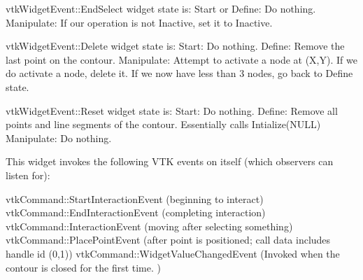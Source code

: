 \begin{DoxyPre}   vtkWidgetEvent::EndSelect
        widget state is: 
            Start or
            Define: Do nothing.
            Manipulate: If our operation is not Inactive, set it to
                  Inactive.\end{DoxyPre}



\begin{DoxyPre}   vtkWidgetEvent::Delete
        widget state is: 
            Start: Do nothing.
            Define: Remove the last point on the contour.
            Manipulate: Attempt to activate a node at (X,Y). If
                   we do activate a node, delete it. If we now
                   have less than 3 nodes, go back to Define state.\end{DoxyPre}



\begin{DoxyPre}   vtkWidgetEvent::Reset
        widget state is: 
            Start: Do nothing.
            Define: Remove all points and line segments of the contour.
                 Essentially calls Intialize(NULL) 
            Manipulate: Do nothing.
 \end{DoxyPre}


This widget invokes the following V\-T\-K events on itself (which observers can listen for)\-: 
\begin{DoxyPre}
   vtkCommand::StartInteractionEvent (beginning to interact)
   vtkCommand::EndInteractionEvent (completing interaction)
   vtkCommand::InteractionEvent (moving after selecting something)
   vtkCommand::PlacePointEvent (after point is positioned; 
                                call data includes handle id (0,1))
   vtkCommand::WidgetValueChangedEvent (Invoked when the contour is closed
                                        for the first time. )
 \end{DoxyPre}



